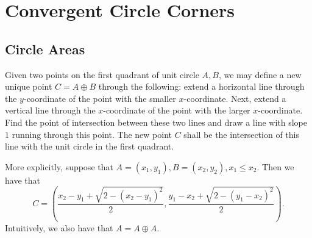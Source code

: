 \documentclass{article}
\begin{document}
\section*{Convergent Circle Corners}

\subsection*{Circle Areas}

Given two points on the first quadrant of unit circle \( A, B \), we may define
a new unique point \( C = A \oplus B \) through the following: extend a
horizontal line through the \( y \)-coordinate of the point with the smaller \(
x \)-coordinate. Next, extend a vertical line through the \( x \)-coordinate of
the point with the larger \( x \)-coordinate. Find the point of intersection
between these two lines and draw a line with slope \( 1 \) running through this
point. The new point \( C \) shall be the intersection of this line with the
unit circle in the first quadrant.

More explicitly, suppose that \( A = \left( x_1, y_1 \right), B = \left( x_2,
y_2 \right), x_1 \leqslant x_2 \). Then we have that
\[
    C = \left( \frac{x_2 - y_1 + \sqrt{2 - \left( x_2 - y_1 \right)^2}}{2}, \frac{y_1 - x_2 + \sqrt{2 - \left( y_1 - x_2 \right)^2}}{2} \right)
.\]
Intuitively, we also have that \( A = A \oplus A \).

\begin{center}
\end{center}
\end{document}
